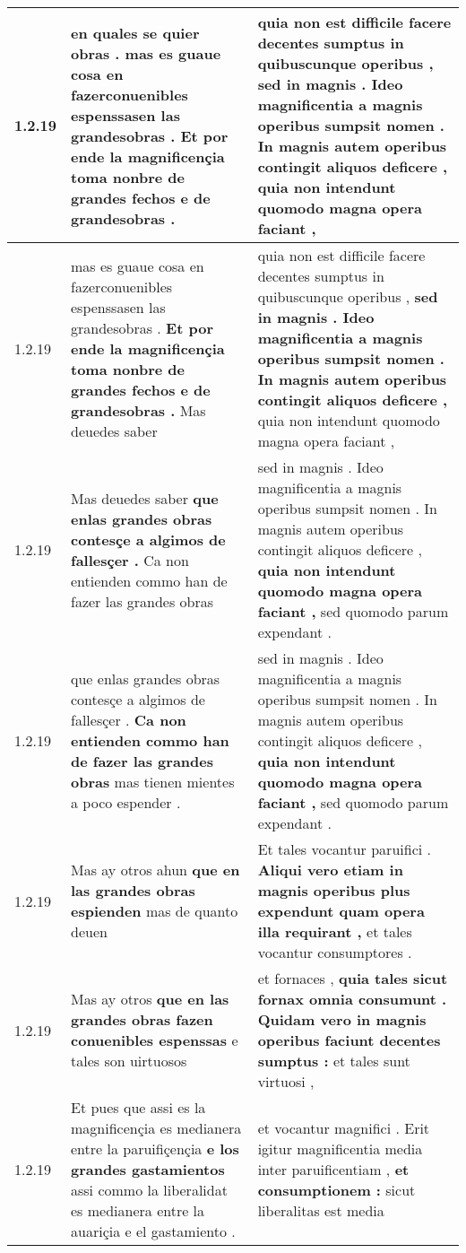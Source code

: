 \begin{tabular}{|p{1cm}|p{6.5cm}|p{6.5cm}|}
1.2.19 & en quales se quier obras . \textbf{ mas es guaue cosa en fazerconuenibles espenssasen las grandesobras . } Et por ende la magnificençia toma nonbre de grandes fechos e de grandesobras . & quia non est difficile facere decentes sumptus in quibuscunque operibus , \textbf{ sed in magnis . Ideo magnificentia a magnis operibus sumpsit nomen . In magnis autem operibus contingit aliquos deficere , } quia non intendunt quomodo magna opera faciant , \\\hline
1.2.19 & mas es guaue cosa en fazerconuenibles espenssasen las grandesobras . \textbf{ Et por ende la magnificençia toma nonbre de grandes fechos e de grandesobras . } Mas deuedes saber & quia non est difficile facere decentes sumptus in quibuscunque operibus , \textbf{ sed in magnis . Ideo magnificentia a magnis operibus sumpsit nomen . In magnis autem operibus contingit aliquos deficere , } quia non intendunt quomodo magna opera faciant , \\\hline
1.2.19 & Mas deuedes saber \textbf{ que enlas grandes obras contesçe a algimos de fallesçer . } Ca non entienden commo han de fazer las grandes obras & sed in magnis . Ideo magnificentia a magnis operibus sumpsit nomen . In magnis autem operibus contingit aliquos deficere , \textbf{ quia non intendunt quomodo magna opera faciant , } sed quomodo parum expendant . \\\hline
1.2.19 & que enlas grandes obras contesçe a algimos de fallesçer . \textbf{ Ca non entienden commo han de fazer las grandes obras } mas tienen mientes a poco espender . & sed in magnis . Ideo magnificentia a magnis operibus sumpsit nomen . In magnis autem operibus contingit aliquos deficere , \textbf{ quia non intendunt quomodo magna opera faciant , } sed quomodo parum expendant . \\\hline
1.2.19 & Mas ay otros ahun \textbf{ que en las grandes obras espienden } mas de quanto deuen & Et tales vocantur paruifici . \textbf{ Aliqui vero etiam in magnis operibus plus expendunt quam opera illa requirant , } et tales vocantur consumptores . \\\hline
1.2.19 & Mas ay otros \textbf{ que en las grandes obras fazen conuenibles espenssas } e tales son uirtuosos & et fornaces , \textbf{ quia tales sicut fornax omnia consumunt . Quidam vero in magnis operibus faciunt decentes sumptus : } et tales sunt virtuosi , \\\hline
1.2.19 & Et pues que assi es la magnificençia es medianera entre la paruifiçençia \textbf{ e los grandes gastamientos } assi commo la liberalidat es medianera entre la auariçia e el gastamiento . & et vocantur magnifici . Erit igitur magnificentia media inter paruificentiam , \textbf{ et consumptionem : } sicut liberalitas est media \\\hline

\end{tabular}
